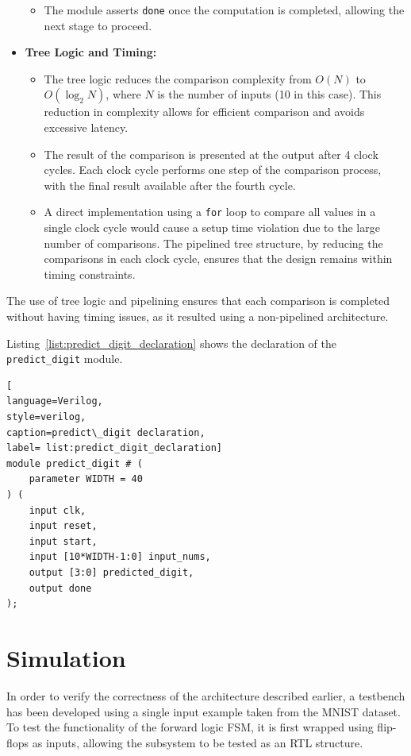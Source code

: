 \documentclass[11pt]{report}
\begin{document}
\begin{itemize}
\begin{itemize}
        \item The module asserts \texttt{done} once the computation is completed, allowing the next stage to proceed.
    \end{itemize}
    \item \textbf{Tree Logic and Timing:}
    \begin{itemize}
        \item The tree logic reduces the comparison complexity from \( O(N) \) to \( O(\log_{2} N) \), where \( N \) is the number of inputs (10 in this case). This reduction in complexity allows for efficient comparison and avoids excessive latency.
        \item The result of the comparison is presented at the output after 4 clock cycles. Each clock cycle performs one step of the comparison process, with the final result available after the fourth cycle.
        \item A direct implementation using a \texttt{for} loop to compare all values in a single clock cycle would cause a setup time violation due to the large number of comparisons. The pipelined tree structure, by reducing the comparisons in each clock cycle, ensures that the design remains within timing constraints.
    \end{itemize}
\end{itemize}

The use of tree logic and pipelining ensures that each comparison is completed without having timing issues, as it resulted using a non-pipelined architecture.

Listing~\ref{list:predict_digit_declaration} shows the declaration of the \texttt{predict\_digit} module.

\begin{lstlisting}[
language=Verilog,
style=verilog,
caption=predict\_digit declaration,
label= list:predict_digit_declaration]
module predict_digit # (
    parameter WIDTH = 40
) (
    input clk,
    input reset,
    input start,
    input [10*WIDTH-1:0] input_nums,
    output [3:0] predicted_digit,
    output done
);
\end{lstlisting}

\section{Simulation}  

In order to verify the correctness of the architecture described earlier, a testbench has been developed using a single input example taken from the MNIST dataset. To test the functionality of the forward logic FSM, it is first wrapped using flip-flops as inputs, allowing the subsystem to be tested as an RTL structure. 
\end{document}

